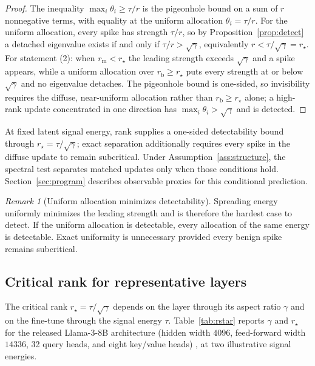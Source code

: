 \documentclass[11pt]{article}
\theoremstyle{definition}
\theoremstyle{remark}
\newtheorem{remark}[theorem]{Remark}
\begin{document}
\begin{proof}
The inequality $\max_i \theta_i \ge \tau/r$ is the pigeonhole bound on a sum of $r$
nonnegative terms, with equality at the uniform allocation $\theta_i = \tau/r$. For the
uniform allocation, every spike has strength $\tau/r$, so by Proposition~\ref{prop:detect}
a detached eigenvalue exists if and only if $\tau/r > \sqrt\gamma$, equivalently $r <
\tau/\sqrt\gamma = r_\star$. For statement (2): when $r_{\mathrm m} < r_\star$ the leading
strength exceeds $\sqrt\gamma$ and a spike appears, while a uniform allocation over
$r_{\mathrm b} \ge r_\star$ puts every strength at or below $\sqrt\gamma$ and no eigenvalue
detaches. The pigeonhole bound is one-sided, so invisibility requires the diffuse,
near-uniform allocation rather than $r_{\mathrm b} \ge r_\star$ alone; a high-rank update
concentrated in one direction has $\max_i \theta_i > \sqrt\gamma$ and is detected.
\end{proof}

At fixed latent signal energy, rank supplies a one-sided detectability bound
through $r_\star=\tau/\sqrt\gamma$; exact separation additionally requires every
spike in the diffuse update to remain subcritical. Under
Assumption~\ref{ass:structure}, the spectral test separates matched updates only
when those conditions hold. Section~\ref{sec:program} describes observable
proxies for this conditional prediction.

\begin{remark}[Uniform allocation minimizes detectability]
\label{rem:uniform}
Spreading energy uniformly minimizes the leading strength and is therefore the hardest
case to detect. If the uniform allocation is detectable, every allocation of the same
energy is detectable. Exact uniformity is unnecessary provided every benign spike remains
subcritical.
\end{remark}

\subsection{Critical rank for representative layers}
\label{sec:layers}

The critical rank $r_\star = \tau/\sqrt\gamma$ depends on the layer through its aspect
ratio $\gamma$ and on the fine-tune through the signal energy $\tau$. Table~\ref{tab:rstar}
reports $\gamma$ and
$r_\star$ for the released Llama-3-8B architecture (hidden width $4096$,
feed-forward width $14336$, 32 query heads, and eight key/value heads)
\cite{grattafiori2024}, at two illustrative signal energies.
\end{document}
